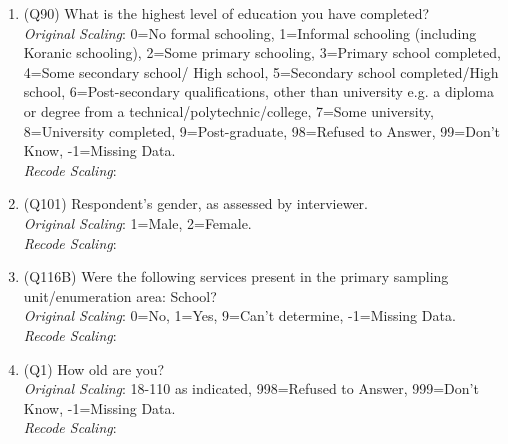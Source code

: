 \documentclass[]{article}
\begin{document}
\begin{enumerate}
  \item (Q90) What is the highest level of education you have completed? \\ \textit{Original Scaling}: 0=No formal schooling, 1=Informal schooling (including Koranic schooling), 2=Some primary schooling, 3=Primary school completed, 4=Some secondary school/ High school, 5=Secondary school completed/High school, 6=Post-secondary qualifications, other than university e.g. a diploma or degree from a technical/polytechnic/college, 7=Some university, 8=University completed, 9=Post-graduate, 98=Refused to Answer, 99=Don’t Know, -1=Missing Data.\\ \textit{Recode Scaling}: 
  \item (Q101) Respondent's gender, as assessed by interviewer.\\ \textit{Original Scaling}: 1=Male, 2=Female. \\ \textit{Recode Scaling}: 
  \item (Q116B) Were the following services present in the primary sampling unit/enumeration area: School? \\ \textit{Original Scaling}: 0=No, 1=Yes, 9=Can’t determine, -1=Missing Data.\\ \textit{Recode Scaling}: 
  \item (Q1) How old are you? \\ \textit{Original Scaling}: 18-110 as indicated, 998=Refused to Answer, 999=Don’t Know, -1=Missing Data. \\ \textit{Recode Scaling}: 

\end{enumerate}
\end{document}

